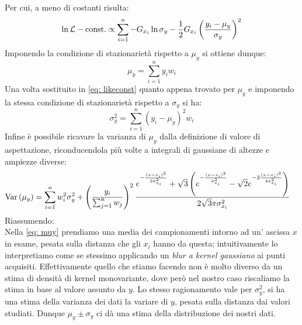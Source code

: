 \documentclass{article}[a4paper, oneside, 11pt]
\begin{document}
Per cui, a meno di costanti risulta:
\begin{equation}\label{eq: likeconst}
	\ln{\mathcal L} - \text{const.} \propto \sum_{i=1}^{n} -G_{x_i} \ln{\sigma_y}
	- \frac{1}{2} G_{x_i} \left( \frac{y_i - \mu_y}{\sigma_y} \right)^2
\end{equation}
Imponendo la condizione di stazionarietà rispetto a $\mu_y$ si ottiene dunque:
\begin{equation}\label{eq: muy}
	\mu_y = \sum_{i=1}^{n} y_i w_i 
\end{equation} 
Una volta sostituito in \eqref{eq: likeconst} quanto appena trovato per $\mu_y$
e imponendo la stessa condizione di stazionarietà rispetto a $\sigma_y$ si ha:
\begin{equation}\label{eq: sigmay}
	\sigma_y^2 = \sum_{i=1}^{n} (y_i - \mu_y)^2 w_i
\end{equation}
Infine è possibile ricavare la varianza di $\mu_y$ dalla definizione di valore
di aspettazione, riconducendola più volte a integrali di gaussiane di altezze
e ampiezze diverse:
\begin{align} \label{aln: varmuy}
	\text{Var}\left(\mu_y\right) &= \sum_{i=1}^{n} w_i^2 \sigma_y^2 + 
	\left(\frac{y_i}{\sum_{j=1}^{n} w_j} \right)^2 \frac{
	e^{-\frac{(x-x_i)^2}{3 \sigma_{x_i}^2}} +  
	\sqrt{3} \left( e^{-\frac{(x-x_i)^2}{\sigma_{x_i}^2}} -
	\sqrt{2} e^{-3 \frac{(x-x_i)^2}{4 \sigma_{x_i}^2}} \right)
	} {2 \sqrt{3}\pi \sigma_{x_i}^2} 
\end{align}
Riassumendo:\\
Nella \eqref{eq: muy} prendiamo una media dei campionamenti intorno ad un'
ascissa $x$ in esame, pesata sulla distanza che gli $x_i$ hanno da questa; 
intuitivamente lo interpretiamo come se stessimo applicando un 
\emph{blur a kernel gaussiano} ai punti acquisiti.
Effettivamente quello che stiamo facendo non è molto diverso da un stima
di densità di kernel monovariante, dove però nel nostro caso
riscaliamo la stima in base al valore assunto da $y$.
Lo stesso ragionamento vale per $\sigma_y^2$, si ha una stima della varianza
dei dati la variare di $y$, pesata sulla distanza dai valori studiati. Dunque
$\mu_y \pm \sigma_y$ ci dà una stima della distribuzione dei nostri dati.
\end{document}
